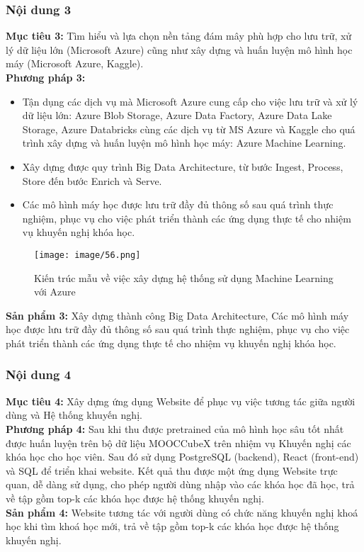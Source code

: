 \subsubsection{Nội dung 3}
\textbf{Mục tiêu 3:} Tìm hiểu và lựa chọn nền tảng đám mây phù hợp cho lưu trữ, xử lý dữ liệu lớn (Microsoft Azure) cũng như xây dựng và huấn luyện mô hình học máy (Microsoft Azure, Kaggle).\\
\textbf{Phương pháp 3:}
\begin{itemize}
    \item Tận dụng các dịch vụ mà Microsoft Azure cung cấp cho việc lưu trữ và xử lý dữ liệu lớn: Azure Blob Storage, Azure Data Factory, Azure Data Lake Storage, Azure Databricks cùng các dịch vụ từ MS Azure và Kaggle cho quá trình xây dựng và huấn luyện mô hình học máy: Azure Machine Learning.
    \item Xây dựng được quy trình Big Data Architecture, từ bước Ingest, Process, Store đến bước Enrich và Serve.
    \item Các mô hình máy học được lưu trữ đầy đủ thông số sau quá trình thực nghiệm, phục vụ cho việc phát triển thành các ứng dụng thực tế cho nhiệm vụ khuyến nghị khóa học.
\end{itemize}
\begin{figure}[h]
    \centering
    \texttt{[image: image/56.png]}
    \caption{Kiến trúc mẫu về việc xây dựng hệ thống sử dụng Machine Learning với Azure}
\end{figure}
\textbf{Sản phẩm 3:} Xây dựng thành công Big Data Architecture, Các mô hình máy học được lưu trữ đầy đủ thông số sau quá trình thực nghiệm, phục vụ cho việc phát triển thành các ứng dụng thực tế cho nhiệm vụ khuyến nghị khóa học.
\subsubsection{Nội dung 4}
\textbf{Mục tiêu 4:} Xây dựng ứng dụng Website để phục vụ việc tương tác giữa người
dùng và Hệ thống khuyến nghị.\\
\textbf{Phương pháp 4:} Sau khi thu được pretrained của mô hình học sâu tốt nhất được huấn luyện trên bộ dữ liệu MOOCCubeX trên nhiệm vụ Khuyến nghị các khóa học cho học viên. Sau đó sử dụng PostgreSQL (backend), React (front-end) và SQL để triển khai website. Kết quả thu được một ứng dụng Website trực quan, dễ dàng sử dụng, cho phép người dùng nhập vào các khóa học đã học, trả về tập gồm top-k các khóa học được hệ thống khuyến nghị.\\
\textbf{Sản phẩm 4:} Website tương tác với người dùng có chức năng khuyến nghị khoá học khi tìm khoá học mới, trả về tập gồm top-k các khóa học được hệ thống khuyến nghị.

